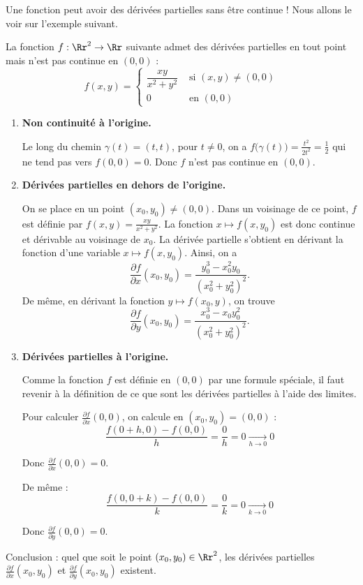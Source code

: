 \documentclass[11pt, class=report,crop=false]{standalone}
\begin{document}
Une fonction peut avoir des dérivées partielles sans être continue !
Nous allons le voir sur l'exemple suivant.
\begin{exemple}
La fonction $f : \Rr^2 \to \Rr$ suivante admet des dérivées partielles en tout point mais n'est pas continue en $(0,0)$ :
$$f(x,y) = \left \lbrace
\begin{array}{ll}
\dfrac{xy}{x^2 + y^2} & \text{ si } (x,y) \neq (0,0) \\
0 & \text{ en } (0,0)
\end{array}
\right.$$


\begin{enumerate}
  \item \textbf{Non continuité à l'origine.} 
  
   Le long du chemin $\gamma(t) = (t,t)$, pour $t\neq 0$, on a $f\big( \gamma(t) \big) = \frac{t^2}{2t^2} = \frac 12$ qui ne tend pas vers $f(0,0)=0$. Donc $f$ n'est pas continue en $(0,0)$.
  
   
   
   
  \item \textbf{Dérivées partielles en dehors de l'origine.}
  
  On se place en un point $(x_0,y_0) \neq (0,0)$. Dans un voisinage de ce point, $f$ est définie par $f(x,y) = \frac{xy}{x^2 + y^2}$. 
  	La fonction $x \mapsto f(x,y_0)$ est donc continue et dérivable au voisinage de $x_0$. La dérivée partielle s'obtient en dérivant la fonction d'une variable  $x \mapsto f(x,y_0)$. Ainsi, on a
$$\frac{\partial f}{\partial x}(x_0,y_0) = \frac{y_0^3-x_0^2y_0}{(x_0^2+y_0^2)^2}.$$  	
De même, en dérivant la fonction $y \mapsto f(x_0,y)$, on trouve 
$$\frac{\partial f}{\partial y}(x_0,y_0) = \frac{x_0^3-x_0y_0^2}{(x_0^2+y_0^2)^2}.$$  

  \item \textbf{Dérivées partielles à l'origine.}
  
  Comme la fonction $f$ est définie en $(0,0)$ par une formule spéciale, il faut revenir à la définition de ce que sont les dérivées partielles à l'aide des limites.
  
  Pour calculer $\frac{\partial f}{\partial x}(0,0)$, on calcule en $(x_0,y_0)=(0,0)$ :
  $$\frac{f(0+h,0) - f(0,0)}{h} = \frac{0}{h} = 0 \underset{h\to 0}{\longrightarrow} 0$$
  
  Donc $\frac{\partial f}{\partial x}(0,0) = 0$.
  
  De même :
   $$\frac{f(0,0+k) - f(0,0)}{k} = \frac{0}{k} = 0 \underset{k\to 0}{\longrightarrow} 0$$
  
  Donc $\frac{\partial f}{\partial y}(0,0) = 0$.  
  
  
\end{enumerate}
  
Conclusion : quel que soit le point $(x_0,y_0)\in\Rr^2$, les dérivées partielles $\frac{\partial f}{\partial x}(x_0,y_0)$ et $\frac{\partial f}{\partial y}(x_0,y_0)$ existent.
\end{exemple}
\end{document}
